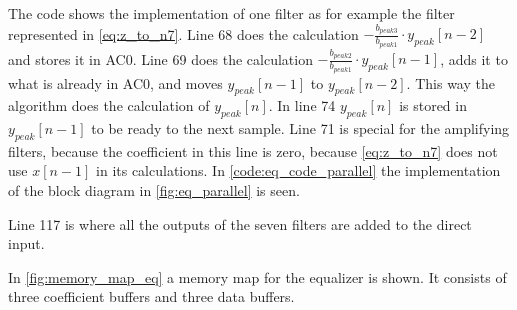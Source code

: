 The code shows the implementation of one filter as for example the filter represented in \autoref{eq:z_to_n7}. Line 68 does the calculation $- \frac{b_{peak3}}{b_{peak1}} \cdot y_{peak}[n-2]$ and stores it in AC0. Line 69 does the calculation $-  \frac{b_{peak2}}{b_{peak1}} \cdot y_{peak}[n-1]$, adds it to what is already in AC0, and moves $y_{peak}[n-1]$ to $y_{peak}[n-2]$. This way the algorithm does the calculation of $y_{peak}[n]$. In line 74 $y_{peak}[n]$ is stored in $y_{peak}[n-1]$ to be ready to the next sample.  
Line 71 is special for the amplifying filters, because the coefficient in this line is zero, because \autoref{eq:z_to_n7} does not use $x[n-1]$ in its calculations. 
In \autoref{code:eq_code_parallel} the implementation of the block diagram in \autoref{fig:eq_parallel} is seen.


Line 117 is where all the outputs of the seven filters are added to the direct input.

In \autoref{fig:memory_map_eq} a memory map for the equalizer is shown. It consists of three coefficient buffers and three data buffers. 

